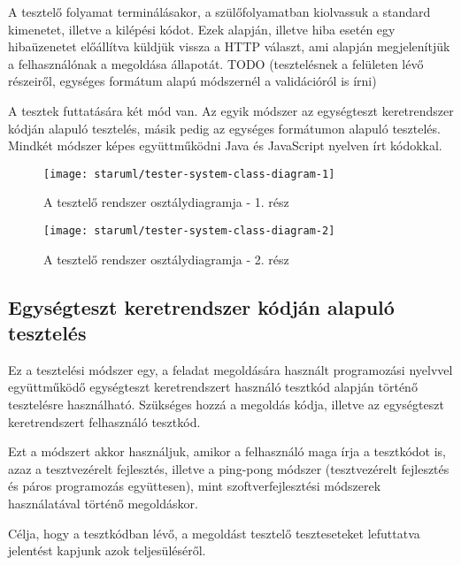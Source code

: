 \documentclass{elteikthesis}
\begin{document}
			A tesztelő folyamat terminálásakor, a szülőfolyamatban kiolvassuk a standard kimenetet, illetve a kilépési kódot. Ezek alapján, illetve hiba esetén egy hibaüzenetet előállítva küldjük vissza a HTTP választ, ami alapján megjelenítjük a felhasználónak a megoldása állapotát. TODO (tesztelésnek a felületen lévő részeiről, egységes formátum alapú módszernél a validációról is írni)
		
			A tesztek futtatására két mód van. Az egyik módszer az egységteszt keretrendszer kódján alapuló tesztelés, másik pedig az egységes formátumon alapuló tesztelés. Mindkét módszer képes együttműködni Java és JavaScript nyelven írt kódokkal.

			\begin{figure}[H]
				\centering
				\texttt{[image: staruml/tester-system-class-diagram-1]}
				\caption{A tesztelő rendszer osztálydiagramja - 1. rész}
			\end{figure}
			
			\begin{figure}[H]
				\centering
				\texttt{[image: staruml/tester-system-class-diagram-2]}
				\caption{A tesztelő rendszer osztálydiagramja - 2. rész}
			\end{figure}
			
			\subsection{Egységteszt keretrendszer kódján alapuló tesztelés}
				Ez a tesztelési módszer egy, a feladat megoldására használt programozási nyelvvel együttműködő egységteszt keretrendszert használó tesztkód alapján történő tesztelésre használható. Szükséges hozzá a megoldás kódja, illetve az egységteszt keretrendszert felhasználó tesztkód.
				
				Ezt a módszert akkor használjuk, amikor a felhasználó maga írja a tesztkódot is, azaz a tesztvezérelt fejlesztés, illetve a ping-pong módszer (tesztvezérelt fejlesztés és páros programozás együttesen), mint szoftverfejlesztési módszerek használatával történő megoldáskor.
				
				Célja, hogy a tesztkódban lévő, a megoldást tesztelő teszteseteket lefuttatva jelentést kapjunk azok teljesüléséről.
\end{document}
